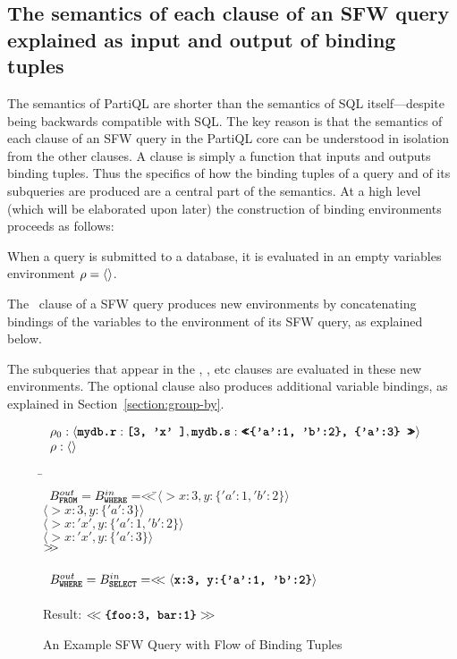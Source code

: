 \subsection{The semantics of each clause of an SFW query explained as
input and output of binding tuples}
\label{sec:clause-semantics}

The semantics of PartiQL are shorter than the semantics of SQL itself---despite
being backwards compatible with SQL. The key reason is that the semantics of
each clause of an SFW query 
in the PartiQL core can be understood in isolation from the other
clauses. A clause is simply a function that inputs and outputs binding tuples.
Thus the specifics of how the binding tuples of a query and of its subqueries
are produced are a central part of the semantics. At a high level (which will be
elaborated upon later) the construction of binding environments proceeds as
follows:

\begin{compact_enum} 
\item When a query is submitted to a database, it is evaluated in an empty
variables environment $\rho = \langle \rangle$.

\item The \from\ clause of a SFW query produces new environments by
concatenating bindings of the  variables to the environment of its SFW
query, as explained below. 

The subqueries that appear in the , , etc clauses are
evaluated in these new environments. The optional  clause also
produces additional variable bindings, as explained in
Section~\ref{section:group-by}.

\end{compact_enum}

\begin{figure}
\[ 
\begin{array}{l}
\rho_{0}: \langle \texttt{\textbf{mydb.r}}:\texttt{\textbf{[3, 'x' ]}}, \texttt{\textbf{mydb.s}}:\texttt{\textbf{<\!\!<\{'a':1, 'b':2\}, \{'a':3\} >\!\!>}} \rangle \\
\rho: \langle \rangle
\end{array}
\]
\begin{tabbing}
\=\\
\>\ $B^{out}_{\texttt{\textbf{FROM}}} = B^{in}_{\texttt{\textbf{WHERE}}} = <\!\!<$\=$\langle \gt{x:3, y:\{'a':1, 'b':2\}} \rangle$\\
\>\>$\langle \gt{x:3, y:\{'a':3\}} \rangle$\\
\>\>$\langle \gt{x:'x', y:\{'a':1, 'b':2\}} \rangle$\\
\>\>$\langle \gt{x:'x', y:\{'a':3\}} \rangle$\\
\>\>\!\!$>\!\!>$\\
\\
\>\ $B^{out}_{\texttt{\textbf{WHERE}}} = B^{in}_{\texttt{\textbf{SELECT}}} = <\!\!<\langle \texttt{\textbf{x:3, y:\{'a':1, 'b':2\}}} \rangle$ \cb\\
\\
\>Result: $<\!\!< \texttt{\textbf{\{foo:3, bar:1\}}} >\!\!>$
\end{tabbing}
\caption{An Example SFW Query with Flow of Binding Tuples}
\label{fig:xmpl:sfw-bindings}
\end{figure}

